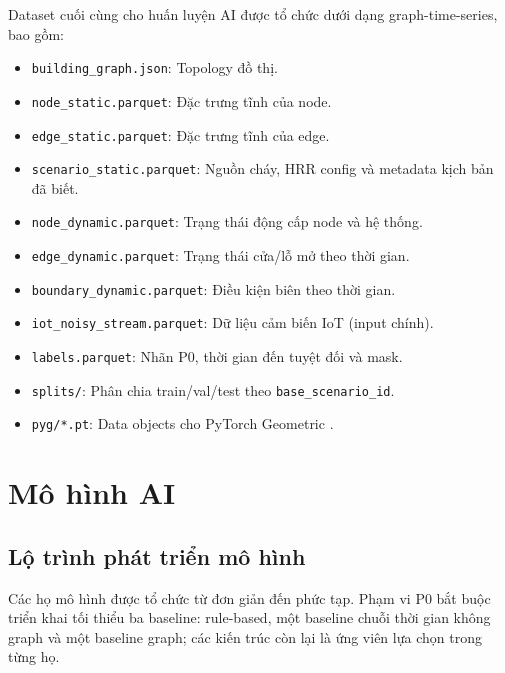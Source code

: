 Dataset cuối cùng cho huấn luyện AI được tổ chức dưới dạng graph-time-series, bao gồm:
\begin{itemize}
  \item \texttt{building\_graph.json}: Topology đồ thị.
  \item \texttt{node\_static.parquet}: Đặc trưng tĩnh của node.
  \item \texttt{edge\_static.parquet}: Đặc trưng tĩnh của edge.
  \item \texttt{scenario\_static.parquet}: Nguồn cháy, HRR config và metadata kịch bản đã biết.
  \item \texttt{node\_dynamic.parquet}: Trạng thái động cấp node và hệ thống.
  \item \texttt{edge\_dynamic.parquet}: Trạng thái cửa/lỗ mở theo thời gian.
  \item \texttt{boundary\_dynamic.parquet}: Điều kiện biên theo thời gian.
  \item \texttt{iot\_noisy\_stream.parquet}: Dữ liệu cảm biến IoT (input chính).
  \item \texttt{labels.parquet}: Nhãn P0, thời gian đến tuyệt đối và mask.
  \item \texttt{splits/}: Phân chia train/val/test theo \texttt{base\_scenario\_id}.
  \item \texttt{pyg/*.pt}: Data objects cho PyTorch Geometric \cite{fey2019pyg}.
\end{itemize}

\section{Mô hình AI}
\label{sec:aimodel}

\subsection{Lộ trình phát triển mô hình}

Các họ mô hình được tổ chức từ đơn giản đến phức tạp. Phạm vi P0 bắt buộc triển khai tối thiểu ba baseline: rule-based, một baseline chuỗi thời gian không graph và một baseline graph; các kiến trúc còn lại là ứng viên lựa chọn trong từng họ.

